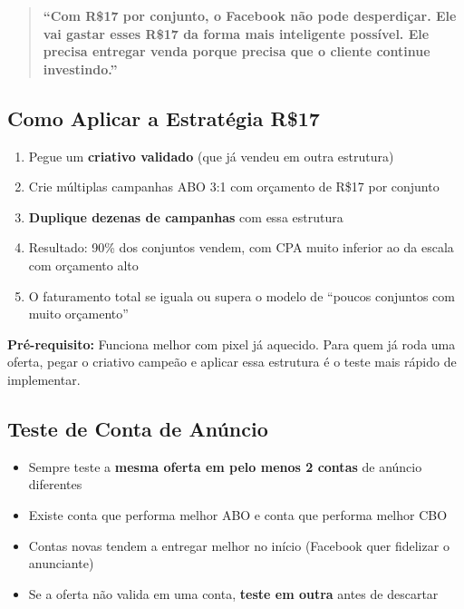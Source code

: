 \documentclass[12pt, a4paper]{article}
\begin{document}
\begin{quote}
\textcolor{primaryColor}{\textbf{``Com R\$17 por conjunto, o Facebook não pode desperdiçar. Ele vai gastar esses R\$17 da forma mais inteligente possível. Ele precisa entregar venda porque precisa que o cliente continue investindo.''}}
\end{quote}

\subsection{Como Aplicar a Estratégia R\$17}

\begin{enumerate}
    \item Pegue um \textbf{criativo validado} (que já vendeu em outra estrutura)
    \item Crie múltiplas campanhas ABO 3:1 com orçamento de R\$17 por conjunto
    \item \textbf{Duplique dezenas de campanhas} com essa estrutura
    \item Resultado: 90\% dos conjuntos vendem, com CPA muito inferior ao da escala com orçamento alto
    \item O faturamento total se iguala ou supera o modelo de ``poucos conjuntos com muito orçamento''
\end{enumerate}

\textcolor{warningOrange}{\textbf{Pré-requisito:}} Funciona melhor com pixel já aquecido. Para quem já roda uma oferta, pegar o criativo campeão e aplicar essa estrutura é o teste mais rápido de implementar.

\subsection{Teste de Conta de Anúncio}

\begin{itemize}
    \item Sempre teste a \textbf{mesma oferta em pelo menos 2 contas} de anúncio diferentes
    \item Existe conta que performa melhor ABO e conta que performa melhor CBO
    \item Contas novas tendem a entregar melhor no início (Facebook quer fidelizar o anunciante)
    \item Se a oferta não valida em uma conta, \textbf{teste em outra} antes de descartar
\end{itemize}

\needspace{8cm}
\end{document}
